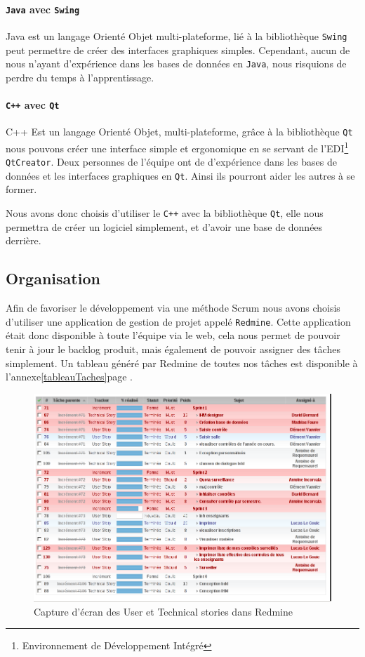 		\paragraph{\texttt{Java} avec \texttt{Swing}} Java est un langage Orienté Objet multi-plateforme, lié à la bibliothèque \texttt{Swing} peut 
		permettre de créer des interfaces graphiques simples. Cependant, aucun de nous n'ayant d'expérience dans les bases de données
		en \texttt{Java}, nous risquions de perdre du temps à l'apprentissage.
		\paragraph{\texttt{C++} avec \texttt{Qt}} C++ Est un langage Orienté Objet, multi-plateforme, grâce à la bibliothèque \texttt{Qt} nous 
		pouvons créer une interface simple et ergonomique en se servant de l'EDI\footnote{Environnement de Développement Intégré} \texttt{QtCreator}. 
		Deux personnes de l'équipe ont de d'expérience dans les bases de données et les interfaces graphiques en \texttt{Qt}. Ainsi
		ils pourront aider les autres à se former. 

		Nous avons donc choisis d'utiliser le \texttt{C++} avec la bibliothèque \texttt{Qt}, elle nous permettra de créer un logiciel simplement,
		et d'avoir une base de données derrière.
	\subsection{Organisation}
		Afin de favoriser le développement via une méthode Scrum nous avons choisis d'utiliser une application de gestion de projet
		appelé \texttt{Redmine}. 
		Cette application était donc disponible à toute l'équipe via le web, cela nous permet de pouvoir tenir à jour le backlog produit, mais également
		de pouvoir assigner des tâches simplement. 
		Un tableau généré par Redmine de toutes nos tâches est disponible à l'annexe\ref{tableauTaches}page \pageref{tableauTaches}.
		\begin{figure}[H]
			\begin{center}
				\includegraphics[width=17.5cm]{images/screenRedmine.png}
			\end{center}
			\caption{Capture d'écran des User et Technical stories dans Redmine}
		\end{figure}


